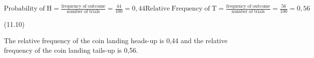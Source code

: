 {\begin{mdframed}[linewidth=4, leftmargin=40, rightmargin=40]
\begin{exercise}
\begin{enumerate}[noitemsep, label=\textbf{Step} \textbf{\arabic*}. ]
{\begin{minipage}{\columnwidth}
{\begin{math}
    \mathrm{Probability\; of\; H}=\frac{\mathrm{frequency\; of\; outcome}}{\mathrm{number\; of\; trials}}=\frac{44}{100}=0,44\mathrm{Relative\; Frequency\; of\; T}=\frac{\mathrm{frequency\; of\; outcome}}{\mathrm{number\; of\; trials}}=\frac{56}{100}=0,56\end{math}}\hfill
    \parbox[t]{48pt}{\raggedleft 
    (11.10)}
    \end{minipage}\vspace{12pt}\par
    }%
    
      
      \label{m39373*id113660}The relative frequency of the coin landing heads-up is
0,44 and the relative frequency of the coin landing tails-up is 0,56. \par 
      \end{enumerate}
         

    \end{exercise}
    \end{mdframed}
    }
    \noindent
  
\label{m39373*secfhsst!!!underscore!!!id649}\vspace{.5cm} 
      
